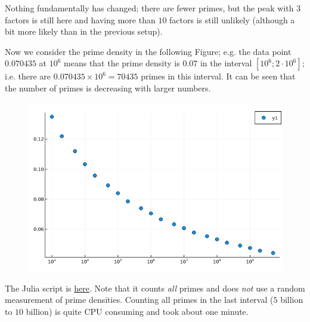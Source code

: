 Nothing fundamentally has changed; there are fewer primes, but the peak with $3$ factors is still here and having more than $10$ factors is still unlikely (although a bit more likely than in the previous setup).

Now we consider the prime density in the following Figure; e.g. the data point $0.070435$ at $10^6$ means that the prime density is $0.07$ in the interval $[10^6; 2 \cdot 10^6]$; i.e. there are $0.070435 \times 10^6 = 70435$ primes in this interval. It can be seen that the number of primes is decreasing with larger numbers.

\begin{figure}[H]
    \centering
    \includegraphics[scale=0.5]{images/primes_03_03.png}
\end{figure}


The Julia script is \href{https://github.com/ClemensFMN/JuliaStuff/blob/master/NumberTheory/prime_count.jl}{here}. Note that it counts \emph{all} primes and does \emph{not} use a random measurement of prime densities. Counting all primes in the last interval ($5$ billion to $10$ billion) is quite CPU consuming and took about one minute.



